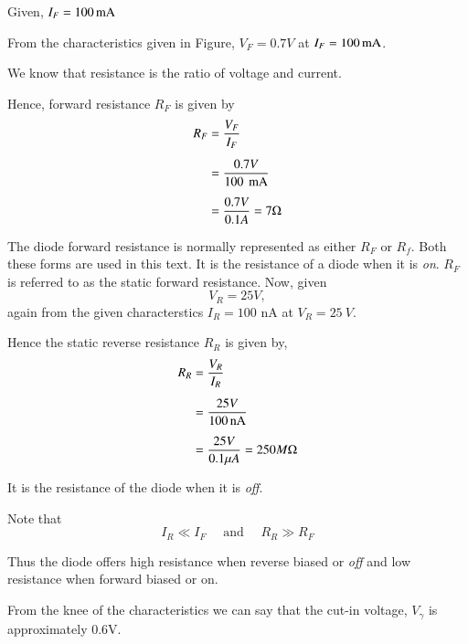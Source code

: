 \begin{solution}
Given, $I_F = 100 \operatorname{mA}$

From the characteristics given in Figure, $V_F = 0.7V$ at $I_F = 100
\operatorname{mA}$.

We know that resistance is the ratio of voltage and current.

Hence, forward resistance $R_F$ is given by
\begin{align*}
R_F & = \frac{V_F}{I_F}\\[5pt]
& = \frac{0.7V}{100~ \operatorname{mA}}\\[5pt]
& = \frac{0.7 V}{0.1 A} = 7 \Omega
\end{align*}

The diode forward resistance is normally represented as either $R_F$
or $R_f$. Both these forms are used in this text. It is the resistance
of a diode when it is {\it on}. $R_F$ is referred to as the static
forward resistance. Now, given 
$$
V_R = 25 V,
$$
again from the given characterstics $I_R = 100$ nA at $V_R = 25~ V$.

Hence the static reverse resistance $R_R$ is given by, 
\begin{align*}
R_R & = \frac{V_R}{I_R}\\[5pt]
& = \frac{25 V}{100\text{\,nA}}\\[5pt]
& = \frac{25 V}{0.1 \mu A} = 250 M \Omega
\end{align*}

It is the resistance of the diode when it is {\it off}.

Note that 
$$
I_R \ll I_F \quad \text{ and }\quad  R_R \gg R_F
$$

Thus the diode offers high resistance when reverse biased or {\it off}
and low resistance when forward biased or on. 

From the knee of the characteristics we can say that the cut-in
voltage, $V_\gamma$ is approximately 0.6V.
\end{solution}

\eject

